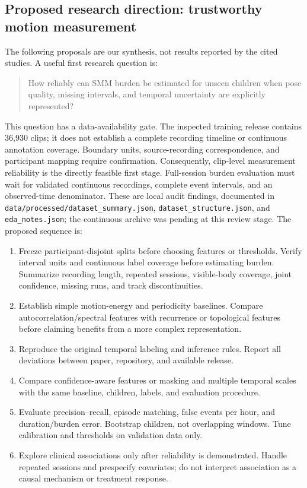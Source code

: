 \subsection{Proposed research direction: trustworthy motion measurement}
The following proposals are our synthesis, not results reported by the cited
studies. A useful first research question is:
\begin{quote}
How reliably can SMM burden be estimated for unseen children when pose quality,
missing intervals, and temporal uncertainty are explicitly represented?
\end{quote}
This question has a data-availability gate. The inspected training release
contains 36,930 clips; it does not establish a complete recording timeline or
continuous annotation coverage. Boundary units, source-recording correspondence,
and participant mapping require confirmation. Consequently, clip-level
measurement reliability is the directly feasible first stage. Full-session
burden evaluation must wait for validated continuous recordings, complete event
intervals, and an observed-time denominator. These are local audit findings,
documented in \texttt{data/processed/dataset\_summary.json},
\texttt{dataset\_structure.json}, and \texttt{eda\_notes.json}; the continuous
archive was pending at this review stage. The proposed sequence is:
\begin{enumerate}
\item Freeze participant-disjoint splits before choosing features or thresholds.
Verify interval units and continuous label coverage before estimating burden.
Summarize recording length, repeated sessions, visible-body coverage, joint
confidence, missing runs, and track discontinuities.
\item Establish simple motion-energy and periodicity baselines. Compare
autocorrelation/spectral features with recurrence or topological features before
claiming benefits from a more complex representation.
\item Reproduce the original temporal labeling and inference rules. Report all
deviations between paper, repository, and available release.
\item Compare confidence-aware features or masking and multiple temporal scales
with the same baseline, children, labels, and evaluation procedure.
\item Evaluate precision--recall, episode matching, false events per hour, and
duration/burden error. Bootstrap children, not overlapping windows. Tune
calibration and thresholds on validation data only.
\item Explore clinical associations only after reliability is demonstrated.
Handle repeated sessions and prespecify covariates; do not interpret association
as a causal mechanism or treatment response.
\end{enumerate}

